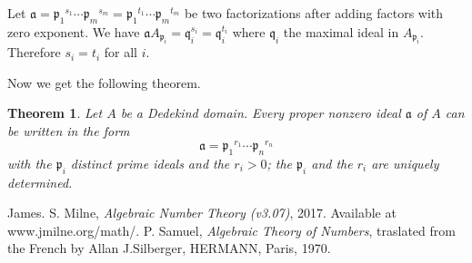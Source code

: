 \documentclass[11pt,a4paper,reqno]{amsart}
\numberwithin{equation}{section}
\newtheorem{thm}{Theorem}[section]
\begin{document}
Let $\mathfrak{a}={\mathfrak{p}_1}^{s_1} \cdots {\mathfrak{p}_m}^{s_m}={\mathfrak{p}_1}^{t_1} \cdots {\mathfrak{p}_m}^{t_m}$ be two factorizations after adding factors with zero exponent.
We have $\mathfrak{a}A_{\mathfrak{p}_i} = \mathfrak{q}^{s_i}_i = \mathfrak{q}^{t_i}_i$ where $\mathfrak{q}_i$ the maximal ideal in $A_{\mathfrak{p}_i}$. Therefore $s_i = t_i$ for all $i$.

Now we get the following theorem.

\begin{thm}\label{3.7}
Let $A$ be a Dedekind domain. Every proper nonzero ideal $\mathfrak{a}$ of $A$ can be written in the form
\[
\mathfrak{a}={{\mathfrak{p}_1}^{r_1}\cdots{\mathfrak{p}_n}^{r_n}}
\]
with the $\mathfrak{p}_i$ distinct prime ideals and the ${r_i}>0$; the $\mathfrak{p}_i$ and the ${r_i}$ are uniquely determined.
\end{thm}


\begin{thebibliography}{alpha} 
 James. S. Milne, \emph{Algebraic Number Theory (v3.07)}, 2017. Available at www.jmilne.org/math/. 
 P. Samuel, \emph{Algebraic Theory of Numbers}, traslated from the French by Allan J.Silberger, HERMANN, Paris, 1970.
\end{thebibliography} 
\end{document}

